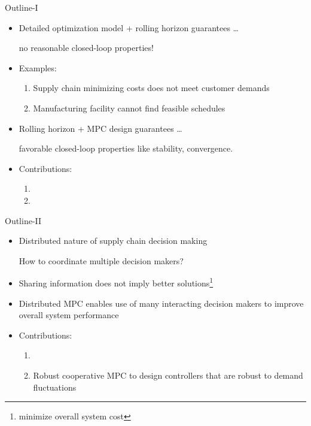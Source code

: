 \documentclass[table]{beamer}
\begin{document}
\begin{frame}{Outline-I}
\begin{itemize}
 \item Detailed optimization model + rolling horizon guarantees \ldots \\   
 \centerline{\alert{no reasonable closed-loop properties!}}  
 \item Examples:
 \begin{enumerate}
  \item Supply chain minimizing costs does not meet customer demands  
  \item Manufacturing facility cannot find feasible schedules  
 \end{enumerate} 
  \item Rolling horizon + MPC design guarantees
    \ldots \\  
  \centerline{\alert{favorable closed-loop properties like stability, convergence.}}   
  \item Contributions:
  \begin{enumerate}
   \item {\color{blue}{Stability and convergence guarantees for supply
         chain using Economic MPC}} 
   \item {\color{blue}{Recursive feasibility and rescheduling
         techniques for iterative scheduling}}
  \end{enumerate}
 \end{itemize}
\end{frame}

\begin{frame}{Outline-II}
\begin{itemize}
\item Distributed nature of supply chain decision making \\
   
 \centerline{\alert{ How to coordinate multiple decision makers?}}  
\item Sharing information does not imply better
  solutions\footnote{minimize overall system cost}   

\item \alert{Distributed} MPC enables use of many interacting decision
  makers to improve overall system performance\footnotemark[\value{footnote}]  

\item Contributions:
 \begin{enumerate}
   \item {\color{blue}{Stability \& convergence guarantees extended to cover supply
     chain models}}  
   \item {\color{blue} {Robust cooperative MPC to design controllers
       that are robust to demand fluctuations}}
 \end{enumerate}
\end{itemize}
\end{frame}
\end{document}
